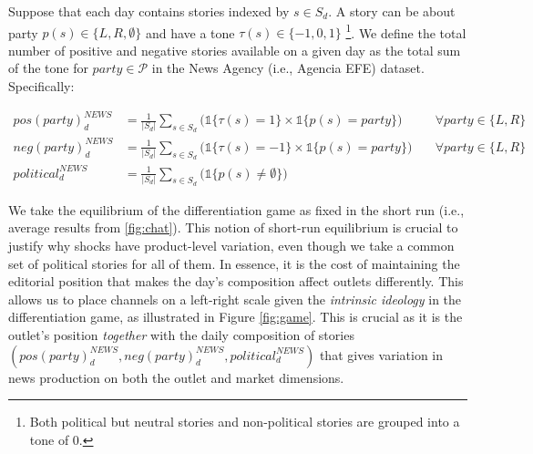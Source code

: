 \documentclass[12pt]{article}
\begin{document}
Suppose that each day contains stories indexed by $ s \in S_d $. A story can be about party $ p(s) \in \{L, R, \emptyset\} $ and have a tone $ \tau(s) \in \{-1, 0, 1\} $ \footnote{Both political but neutral stories and non-political stories are grouped into a tone of 0.}. We define the total number of positive and negative stories available on a given day as the total sum of the tone for $ party \in \mathcal{P}  $ in the News Agency (i.e., Agencia EFE) dataset. Specifically:



	\begin{equation}\label{eq:first_stage}
	\begin{aligned}
		 pos(party)_d^{NEWS}&= \frac{1}{|S_d|} \sum_{s \in S_d}\bigg(\mathds{1}\{\tau(s)=1\} \times \mathds{1}\{p(s)=party\} \bigg)\quad &\forall party \in \{L,R\}\\
		neg(party)_d^{NEWS}&= \frac{1}{|S_d|}\sum_{s \in S_d}\bigg( \mathds{1}\{\tau(s)=-1\} \times \mathds{1}\{p(s)=party\} \bigg) \quad &\forall party \in \{L,R\}\\
		political_d^{NEWS}&=\frac{1}{|S_d|} \sum_{s \in S_d}\bigg(  \mathds{1}\{p(s)\neq\emptyset\} \bigg)
	\end{aligned}
\end{equation} 


We take the equilibrium of the differentiation game as fixed in the short run (i.e., average results from \ref{fig:chat}). This notion of short-run equilibrium is crucial to justify why shocks have product-level variation, even though we take a common set of political stories for all of them. In essence, it is the cost of maintaining the editorial position that makes the day's composition affect outlets differently. This allows us to place channels on a left-right scale given the \textit{intrinsic ideology} in the differentiation game, as illustrated in Figure \ref{fig:game}. This is crucial as it is the outlet's position \textit{together} with the daily composition of stories $ (pos(party)_d^{NEWS},neg(party)_d^{NEWS}, political_d^{NEWS}) $ that gives variation in news production on both the outlet and market dimensions. 
\end{document}
